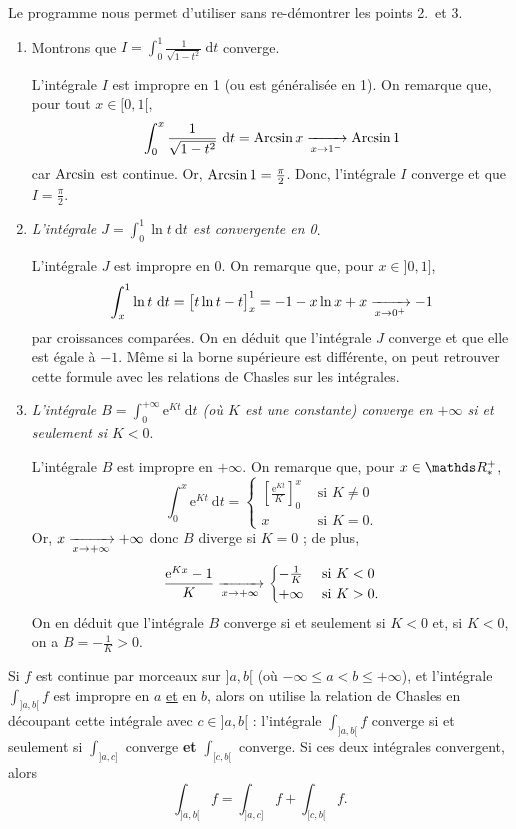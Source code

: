 \begin{exm}
	Le programme nous permet d'utiliser sans re-démontrer les points 2.\ et 3.
	\begin{enumerate}
		\item Montrons que $I = \int_{0}^{1} \frac{1}{\sqrt{1-t^2}}~\mathrm{d}t$\/ converge.

			L'intégrale $I$\/ est impropre en 1 (ou est généralisée en 1).
			On remarque que, pour tout $x \in [0, 1[$, \[
				\int_{0}^{x}\frac{1}{\sqrt{1-t^2}}~\mathrm{d}t = \operatorname{Arcsin} x \xrightarrow[x \to 1^-]{} \operatorname{Arcsin} 1
			\] car $\operatorname{Arcsin}$\/ est continue. Or, $\operatorname{Arcsin} 1 = \frac{\pi}{2}$. Donc, l'intégrale $I$\/ converge et que $I = \frac{\pi}{2}$.
		\item {\sl L'intégrale $J = \int_{0}^{1} \ln t~\mathrm{d}t$\/ est convergente en 0}.

			L'intégrale $J$\/ est impropre en 0. On remarque que, pour $x \in {]0, 1]}$, \[
				\int_{x}^{1} \ln t~\mathrm{d}t = \big[t \ln t - t\big]_x^1 = -1 - x \ln x + x \xrightarrow[x \to 0^+]{} -1
			\] par croissances comparées. On en déduit que l'intégrale $J$\/ converge et que elle est égale à $-1$. Même si la borne supérieure est différente, on peut retrouver cette formule avec les relations de {\sc Chasles}\/ sur les intégrales.
		\item {\sl L'intégrale $B = \int_{0}^{+\infty} \mathrm{e}^{Kt}~\mathrm{d}t$\/ (où $K$\/ est une constante) converge en $+\infty$\/ si et seulement si $K < 0$}.

			L'intégrale $B$\/ est impropre en $+\infty$. On remarque que, pour $x \in \R^+_*$, \[
				\int_{0}^{x} \mathrm{e}^{Kt}~\mathrm{d}t = \begin{cases}
					\left[ \frac{\mathrm{e}^{Kt}}{K} \right]_0^x &\text{ si } K \neq 0\\
					x&\text{ si } K = 0.
				\end{cases}
			\]
			Or, $x \xrightarrow[x\to +\infty]{} +\infty$\/ donc $B$\/ diverge si $K = 0$\/ ; de plus, \[
				\frac{\mathrm{e}^{Kx}- 1}{K} \xrightarrow[x\to +\infty]{} \begin{cases}
					-\frac{1}{K} &\text{ si } K < 0\\
					+\infty & \text{ si } K > 0.
				\end{cases}
			\] On en déduit que l'intégrale $B$\/ converge si et seulement si $K < 0$\/ et, si $K < 0$, on a $B = -\frac{1}{K} > 0$.
	\end{enumerate}
\end{exm}

\begin{rmk}
	Si $f$\/ est continue par morceaux sur $]a,b[$\/ (où $-\infty \le a < b \le +\infty$), et l'intégrale $\int_{]a,b[} f$\/ est impropre en $a$\/ \ul{et} en $b$, alors on utilise la relation de {\sc Chasles}\/ en découpant cette intégrale avec $c \in ]a,b[$\/ : l'intégrale $\int_{]a,b[} f$\/ converge si et seulement si $\int_{]a,c]}$\/ converge {\bf et}\/ $\int_{[c,b[}$\/ converge. Si ces deux intégrales convergent, alors \[
		\int_{]a,b[} f = \int_{]a,c]} f + \int_{[c,b[} f
	.\]
\end{rmk}

